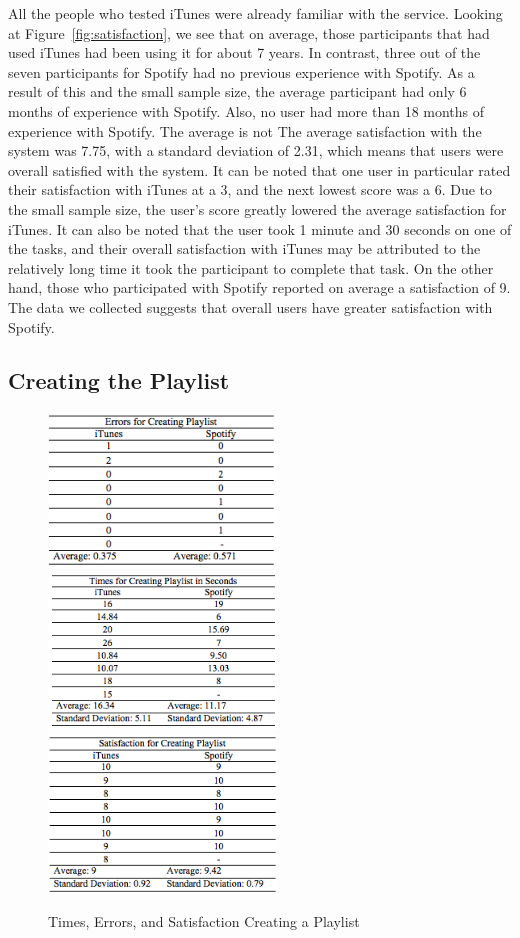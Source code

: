 \documentclass[11pt]{article}
\begin{document}
All the people who tested iTunes were already familiar with the service. Looking at Figure~\ref{fig:satisfaction}, we see that on average, those participants that had used iTunes had been using it for about 7 years. In contrast, three out of the seven participants for Spotify had no previous experience with Spotify. As a result of this and the small sample size, the average participant had only 6 months of experience with Spotify. Also, no user had more than 18 months of experience with Spotify. The average is not  The average satisfaction with the system was 7.75, with a standard deviation of 2.31, which means that users were overall satisfied with the system. It can be noted that one user in particular rated their satisfaction with iTunes at a 3, and the next lowest score was a 6. Due to the small sample size, the user's score greatly lowered the average satisfaction for iTunes. It can also be noted that the user took 1 minute and 30 seconds on one of the tasks, and their overall satisfaction with iTunes may be attributed to the relatively long time it took the participant to complete that task. On the other hand, those who participated with Spotify reported on average a satisfaction of 9. The data we collected suggests that overall users have greater satisfaction with Spotify.

\subsection{Creating the Playlist}

\begin{figure}[H] %
   \centering
   \includegraphics[width=2.4in]{errors_playlist.png}       
   \includegraphics[width=2.4in]{times_playlist.png} 
   \includegraphics[width=2.4in]{satisfaction_playlist.png} 
   \caption{Times, Errors, and Satisfaction Creating a Playlist}
   \label{fig:playlist}
\end{figure}
\end{document}
